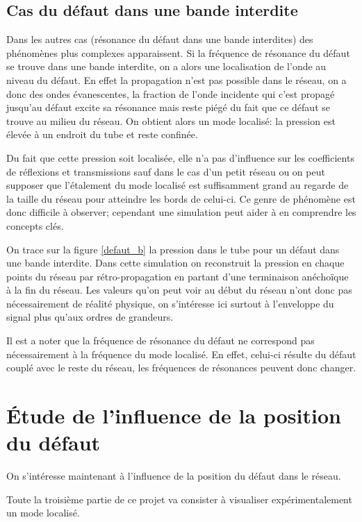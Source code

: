 \subsection{Cas du défaut dans une bande interdite}

Dans les autres cas (résonance du défaut dans une bande interdites) des phénomènes plus complexes apparaissent.
Si la fréquence de résonance du défaut se trouve dans une bande interdite, on a alors une localisation de l'onde au niveau du défaut. En effet la propagation n'est pas possible dans le réseau, on a donc des ondes évanescentes, la fraction de l'onde incidente qui c'est propagé jusqu'au défaut excite sa résonance mais reste piégé du fait que ce défaut se trouve au milieu du réseau. On obtient alors un mode localisé: la pression est élevée à un endroit du tube et reste confinée.
\bigskip


Du fait que cette pression soit localisée, elle n'a pas d'influence sur les coefficients de réflexions et transmissions sauf dans le cas d'un petit réseau ou on peut supposer que l'étalement du mode localisé est suffisamment grand au regarde de la taille du réseau pour atteindre les bords de celui-ci. Ce genre de phénomène est donc difficile à observer; cependant une simulation peut aider à en comprendre les concepts clés.
\bigskip

On trace sur la figure \ref{defaut_b} la pression dans le tube pour un défaut dans une bande interdite. Dans cette simulation on reconstruit la pression en chaque points du réseau par rétro-propagation en partant d'une terminaison anéchoïque à la fin du réseau. Les valeurs qu'on peut voir au début du réseau n'ont donc pas nécessairement de réalité physique, on s'intéresse ici surtout à l'enveloppe du signal plus qu'aux ordres de grandeurs.



Il est a noter que la fréquence de résonance du défaut ne correspond pas nécessairement à la fréquence du mode localisé. En effet, celui-ci résulte du défaut couplé avec le reste du réseau, les fréquences de résonances peuvent donc changer.


\section{Étude de l'influence de la position du défaut}
On s’intéresse maintenant à l'influence de la position du défaut dans le réseau.




Toute la troisième partie de ce projet va consister à visualiser expérimentalement un mode localisé.
